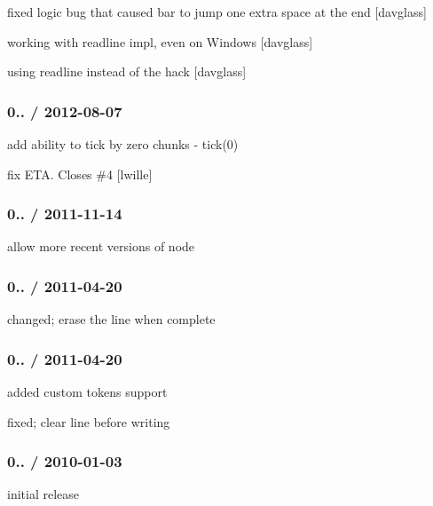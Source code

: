 \begin{DoxyItemize}
\item fixed logic bug that caused bar to jump one extra space at the end \mbox{[}davglass\mbox{]}
\item working with readline impl, even on Windows \mbox{[}davglass\mbox{]}
\item using readline instead of the  hack \mbox{[}davglass\mbox{]}
\end{DoxyItemize}

\subsubsection*{0.. / 2012-\/08-\/07}


\begin{DoxyItemize}
\item add ability to tick by zero chunks -\/ tick(0)
\item fix E\+T\+A. Closes \#4 \mbox{[}lwille\mbox{]}
\end{DoxyItemize}

\subsubsection*{0.. / 2011-\/11-\/14}


\begin{DoxyItemize}
\item allow more recent versions of node
\end{DoxyItemize}

\subsubsection*{0.. / 2011-\/04-\/20}


\begin{DoxyItemize}
\item changed; erase the line when complete
\end{DoxyItemize}

\subsubsection*{0.. / 2011-\/04-\/20}


\begin{DoxyItemize}
\item added custom tokens support
\item fixed; clear line before writing
\end{DoxyItemize}

\subsubsection*{0.. / 2010-\/01-\/03}


\begin{DoxyItemize}
\item initial release 
\end{DoxyItemize}